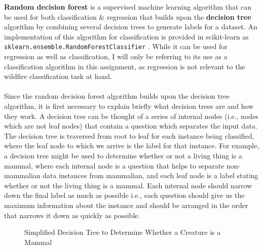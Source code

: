 \documentclass[a4paper, 10pt]{article}
\begin{document}
\textbf{Random decision forest} is a supervised machine learning algorithm that can be used for both classification \& regression that builds upon the \textbf{decision tree} algorithm by combining several decision trees to generate labels for a dataset.
An implementation of this algorithm for classification is provided in scikit-learn as \texttt{sklearn.ensemble.RandomForestClassifier} \supercite{scikit_randomforestclassifier}.
While it can be used for regression as well as classification, I will only be referring to its use as a classification algorithm in this assignment, as regression is not relevant to the wildfire classification task at hand.
\\\\
Since the random decision forest algorithm builds upon the decision tree algorithm, it is first necessary to explain briefly what decision trees are and how they work.
A decision tree can be thought of a series of internal nodes (i.e., nodes which are not leaf nodes) that contain a question which separates the input data.
The decision tree is traversed from root to leaf for each instance being classified, where the leaf node to which we arrive is the label for that instance.
For example, a decision tree might be used to determine whether or not a living thing is a mammal, where each internal node is a question that helps to separate non-mammalian data instances from mammalian, and each leaf node is a label stating whether or not the living thing is a mammal.
Each internal node should narrow down the final label as much as possible i.e., each question should give us the maximum information about the instance and should be arranged in the order that narrows it down as quickly as possible.

\begin{figure}[H]
    \centering
    \caption{Simplified Decision Tree to Determine Whether a Creature is a Mammal}
\end{figure}
\end{document}
